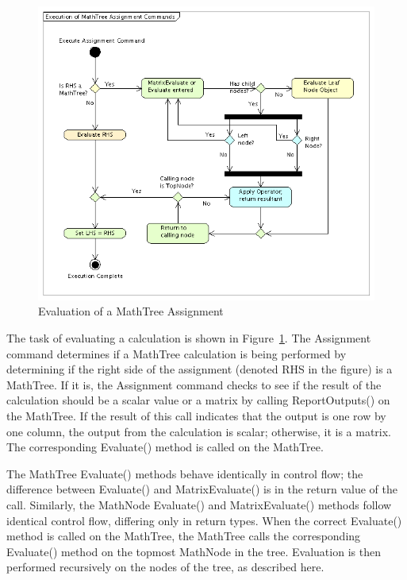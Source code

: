\begin{figure}
\begin{center}
\includegraphics[370,320]{Images/MathTreeExecution.png}
\caption{\label{figure:MathTreeExecution}Evaluation of a MathTree Assignment}
\end{center}
\end{figure}

The task of evaluating a calculation is shown in Figure~\ref{figure:MathTreeExecution}.  The
Assignment command determines if a MathTree calculation is being performed by determining if the
right side of the assignment (denoted RHS in the figure) is a MathTree.  If it is, the Assignment
command checks to see if the result of the calculation should be a scalar value or a matrix by
calling ReportOutputs() on the MathTree.  If the result of this call indicates that the output is
one row by one column, the output from the calculation is scalar; otherwise, it is a matrix.  The
corresponding Evaluate() method is called on the MathTree.

The MathTree Evaluate() methods behave identically in control flow; the
difference between Evaluate() and MatrixEvaluate() is in the return value of
the call.  Similarly, the MathNode Evaluate() and MatrixEvaluate() methods
follow identical control flow, differing only in return types.  When the
correct Evaluate() method is called on the MathTree, the MathTree calls the
corresponding Evaluate() method on the topmost MathNode in the tree.
Evaluation is then performed recursively on the nodes of the tree, as described
here.

